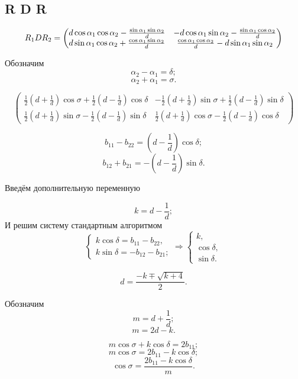 \subsection{R D R}

$$R_1DR_2 =
 \begin{pmatrix} d \cos\alpha_1 \cos\alpha_2 - {{\sin\alpha_1 \sin\alpha_2}\over{d}} & - d \cos\alpha_1 \sin\alpha_2 - {{\sin\alpha_1 \cos\alpha_2}\over{d}} \\
d \sin\alpha_1 \cos\alpha_2 + {{\cos\alpha_1 \sin\alpha_2}\over{d}} & {{\cos\alpha_1 \cos\alpha_2}\over{d}} - d \sin\alpha_1 \sin\alpha_2 \\
 \end{pmatrix} $$


Обозначим 
$$\alpha_2 - \alpha_1 = \delta;$$
$$\alpha_2 + \alpha_1 = \sigma.$$

$$
\begin{pmatrix}
	 \frac{1}{2}\left( d + \frac{1}{d} \right)  \cos{\sigma} + \frac{1}{2}\left( d - \frac{1}{d} \right)  \cos{\delta} &
	-\frac{1}{2}\left( d + \frac{1}{d} \right)  \sin{\sigma} + \frac{1}{2}\left( d - \frac{1}{d} \right)  \sin{\delta} \\
	 \frac{1}{2}\left( d + \frac{1}{d} \right)  \sin{\sigma} - \frac{1}{2}\left( d - \frac{1}{d} \right)  \sin{\delta} & 
	 \frac{1}{2}\left( d + \frac{1}{d} \right)  \cos{\sigma} - \frac{1}{2}\left( d - \frac{1}{d} \right)  \cos{\delta}
\end{pmatrix}
$$


$$b_{11} - b_{22} =  \left( d - \frac{1}{d} \right) \cos\delta; $$
$$b_{12} + b_{21} = -\left( d - \frac{1}{d} \right) \sin\delta. $$

Введём дополнительную переменную

$$k = d - \frac{1}{d};$$
И решим систему стандартным алгоритмом
$$\begin{cases}
	k \cos\delta =  b_{11} - b_{22},\\
	k \sin\delta = -b_{12} - b_{21};
\end{cases}
\Rightarrow
\begin{cases}
	k,\\
	\cos\delta,\\
    \sin\delta.
\end{cases}$$

$$d = \frac{-k \mp \sqrt{k+4}}{2}.$$

Обозначим
$$m = d + \frac{1}{d};$$
$$m = 2d - k.$$

$$m \cos{\sigma} + k \cos{\delta} = 2 b_{11};$$
$$m \cos{\sigma} = 2 b_{11} - k \cos{\delta};$$
$$\cos{\sigma} = \frac{2 b_{11} - k \cos{\delta}}{m}.$$